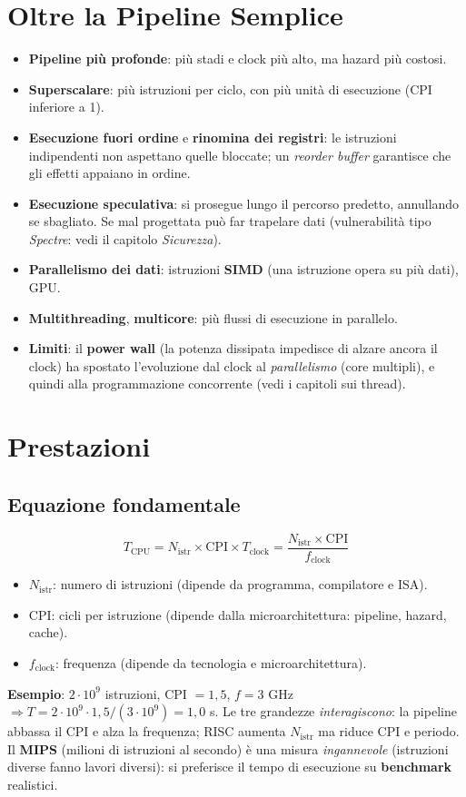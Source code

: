 \section{Oltre la Pipeline Semplice}
\begin{itemize}
    \item \textbf{Pipeline più profonde}: più stadi e clock più alto, ma hazard più costosi.
    \item \textbf{Superscalare}: più istruzioni per ciclo, con più unità di esecuzione (CPI inferiore a 1).
    \item \textbf{Esecuzione fuori ordine} e \textbf{rinomina dei registri}: le istruzioni indipendenti non aspettano quelle bloccate; un \emph{reorder buffer} garantisce che gli effetti appaiano in ordine.
    \item \textbf{Esecuzione speculativa}: si prosegue lungo il percorso predetto, annullando se sbagliato. Se mal progettata può far trapelare dati (vulnerabilità tipo \emph{Spectre}: vedi il capitolo \emph{Sicurezza}).
    \item \textbf{Parallelismo dei dati}: istruzioni \textbf{SIMD} (una istruzione opera su più dati), GPU.
    \item \textbf{Multithreading}, \textbf{multicore}: più flussi di esecuzione in parallelo.
    \item \textbf{Limiti}: il \textbf{power wall} (la potenza dissipata impedisce di alzare ancora il clock) ha spostato l'evoluzione dal clock al \emph{parallelismo} (core multipli), e quindi alla programmazione concorrente (vedi i capitoli sui thread).
\end{itemize}

\section{Prestazioni}

\subsection{Equazione fondamentale}
\[
T_{\text{CPU}} = N_{\text{istr}} \times \text{CPI} \times T_{\text{clock}} = \frac{N_{\text{istr}}\times \text{CPI}}{f_{\text{clock}}}
\]
\begin{itemize}
    \item $N_{\text{istr}}$: numero di istruzioni (dipende da programma, compilatore e ISA).
    \item $\text{CPI}$: cicli per istruzione (dipende dalla microarchitettura: pipeline, hazard, cache).
    \item $f_{\text{clock}}$: frequenza (dipende da tecnologia e microarchitettura).
\end{itemize}
\textbf{Esempio}: $2\cdot 10^9$ istruzioni, CPI $=1{,}5$, $f=3$ GHz $\Rightarrow T = 2\cdot 10^9 \cdot 1{,}5 / (3\cdot 10^9) = 1{,}0$ s.
Le tre grandezze \emph{interagiscono}: la pipeline abbassa il CPI e alza la frequenza; RISC aumenta $N_{\text{istr}}$ ma riduce CPI e periodo. Il \textbf{MIPS} (milioni di istruzioni al secondo) è una misura \emph{ingannevole} (istruzioni diverse fanno lavori diversi): si preferisce il tempo di esecuzione su \textbf{benchmark} realistici.

